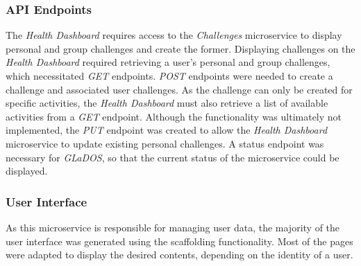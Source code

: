 \subsubsection{API Endpoints}
\par
The \textit{Health Dashboard} requires access to the \textit{Challenges} microservice to display personal and group challenges and create the former. Displaying challenges on the \textit{Health Dashboard} required retrieving a user's personal and group challenges, which necessitated \textit{GET} endpoints. \textit{POST} endpoints were needed to create a challenge and associated user challenges. As the challenge can only be created for specific activities, the \textit{Health Dashboard} must also retrieve a list of available activities from a \textit{GET} endpoint.
Although the functionality was ultimately not implemented, the \textit{PUT} endpoint was created to allow the \textit{Health Dashboard} microservice to update existing personal challenges.
A status endpoint was necessary for \textit{GLaDOS}, so that the current status of the microservice could be displayed.

\subsubsection{User Interface}
\par
As this microservice is responsible for managing user data, the majority of the user interface was generated using the scaffolding functionality. Most of the pages were adapted to display the desired contents, depending on the identity of a user.
